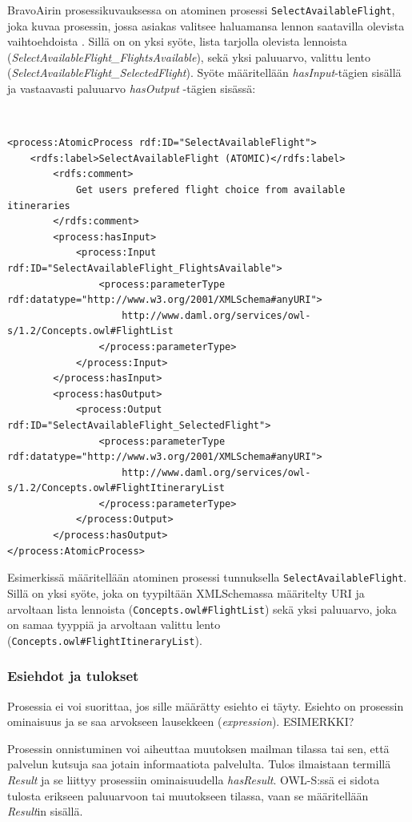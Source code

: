 \documentclass[finnish]{tktltiki2}
\theoremstyle{definition}
\theoremstyle{remark}
\begin{document}
BravoAirin prosessikuvauksessa on atominen prosessi \texttt{SelectAvailableFlight}, joka kuvaa prosessin, jossa asiakas valitsee haluamansa lennon saatavilla olevista vaihtoehdoista \cite{daml}. Sillä on on yksi syöte, lista tarjolla olevista lennoista (\textit{SelectAvailableFlight\_FlightsAvailable}), sekä yksi paluuarvo, valittu lento (\textit{SelectAvailableFlight\_SelectedFlight}). Syöte määritellään \textit{hasInput}-tägien sisällä ja vastaavasti paluuarvo \textit{hasOutput} -tägien sisässä\cite{daml}:

\
\begin{verbatim}
<process:AtomicProcess rdf:ID="SelectAvailableFlight">
    <rdfs:label>SelectAvailableFlight (ATOMIC)</rdfs:label>
        <rdfs:comment>
            Get users prefered flight choice from available itineraries
        </rdfs:comment>
        <process:hasInput>
            <process:Input rdf:ID="SelectAvailableFlight_FlightsAvailable">
                <process:parameterType rdf:datatype="http://www.w3.org/2001/XMLSchema#anyURI">
                    http://www.daml.org/services/owl-s/1.2/Concepts.owl#FlightList
                </process:parameterType>
            </process:Input>
        </process:hasInput>
        <process:hasOutput>
            <process:Output rdf:ID="SelectAvailableFlight_SelectedFlight">
                <process:parameterType rdf:datatype="http://www.w3.org/2001/XMLSchema#anyURI">
                    http://www.daml.org/services/owl-s/1.2/Concepts.owl#FlightItineraryList
                </process:parameterType>
            </process:Output>
        </process:hasOutput>
</process:AtomicProcess>
\end{verbatim}


Esimerkissä määritellään atominen prosessi tunnuksella \texttt{SelectAvailableFlight}. Sillä on yksi syöte, joka on tyypiltään XMLSchemassa määritelty  URI ja arvoltaan lista lennoista (\texttt{Concepts.owl\#FlightList}) sekä yksi paluuarvo, joka on samaa tyyppiä ja arvoltaan valittu lento (\texttt{Concepts.owl\#FlightItineraryList}). 


\subsubsection{Esiehdot ja tulokset}

Prosessia ei voi suorittaa, jos sille määrätty esiehto ei täyty\cite{OWLS}. Esiehto on prosessin ominaisuus ja se saa arvokseen lausekkeen (\textit{expression}). ESIMERKKI?

Prosessin onnistuminen voi aiheuttaa muutoksen mailman tilassa tai sen, että palvelun kutsuja saa jotain informaatiota palvelulta. Tulos ilmaistaan termillä \textit{Result} ja se liittyy prosessiin ominaisuudella \textit{hasResult}. OWL-S:ssä ei sidota tulosta erikseen paluuarvoon tai muutokseen tilassa, vaan se määritellään \textit{Result}in sisällä\cite{OWLS}. 
\end{document}
